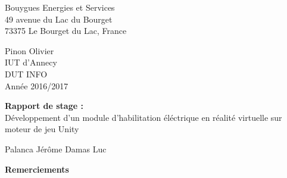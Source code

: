 \documentclass[a4paper]{article}
\begin{document}
    \pagestyle{empty}
    \noindent
    \begin{minipage}{.5\textwidth}
        Bouygues Energies et Services \\
        49 avenue du Lac du Bourget \\
        73375 Le Bourget du Lac, France
    \end{minipage}
    \begin{minipage}{.5\textwidth}
    \begin{flushright}
        Pinon Olivier \\
        IUT d'Annecy \\
        DUT INFO \\
        Année 2016/2017 \\
    \end{flushright}
    \end{minipage}
    
    \vfill 
    \begin{center}
		\Huge{\textbf{Rapport de stage : }} \\
        \vspace{20pt}
        \Large{Développement d'un module d'habilitation éléctrique en réalité virtuelle sur moteur de jeu Unity}
        
	\end{center}
    \vfill 
    
    Palanca Jérôme  \hfill Damas Luc

 	\newpage 
    \pagestyle{fancy}
 	
    \huge \textbf{Remerciements} \vspace{5pt} \\
   
\end{document}
